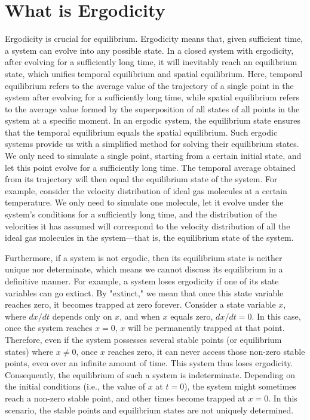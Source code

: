 \documentclass[12pt]{article}
\begin{document}
	\MakeScribeTop

\tableofcontents

\section{What is Ergodicity}

Ergodicity is crucial for equilibrium. Ergodicity means that, given sufficient time, a system can evolve into any possible state. In a closed system with ergodicity, after evolving for a sufficiently long time, it will inevitably reach an equilibrium state, which unifies temporal equilibrium and spatial equilibrium. Here, temporal equilibrium refers to the average value of the trajectory of a single point in the system after evolving for a sufficiently long time, while spatial equilibrium refers to the average value formed by the superposition of all states of all points in the system at a specific moment. In an ergodic system, the equilibrium state ensures that the temporal equilibrium equals the spatial equilibrium. Such ergodic systems provide us with a simplified method for solving their equilibrium states. We only need to simulate a single point, starting from a certain initial state, and let this point evolve for a sufficiently long time. The temporal average obtained from its trajectory will then equal the equilibrium state of the system. For example, consider the velocity distribution of ideal gas molecules at a certain temperature. We only need to simulate one molecule, let it evolve under the system's conditions for a sufficiently long time, and the distribution of the velocities it has assumed will correspond to the velocity distribution of all the ideal gas molecules in the system—that is, the equilibrium state of the system.

Furthermore, if a system is not ergodic, then its equilibrium state is neither unique nor determinate, which means we cannot discuss its equilibrium in a definitive manner. For example, a system loses ergodicity if one of its state variables can go extinct. By "extinct," we mean that once this state variable reaches zero, it becomes trapped at zero forever. Consider a state variable $x$, where $dx/dt$ depends only on $x$, and when $x$ equals zero, $dx/dt = 0$. In this case, once the system reaches $x=0$, $x$ will be permanently trapped at that point. Therefore, even if the system possesses several stable points (or equilibrium states) where $x \neq 0$, once $x$ reaches zero, it can never access those non-zero stable points, even over an infinite amount of time. This system thus loses ergodicity. Consequently, the equilibrium of such a system is indeterminate. Depending on the initial conditions (i.e., the value of $x$ at $t=0$), the system might sometimes reach a non-zero stable point, and other times become trapped at $x=0$. In this scenario, the stable points and equilibrium states are not uniquely determined.
\end{document}
